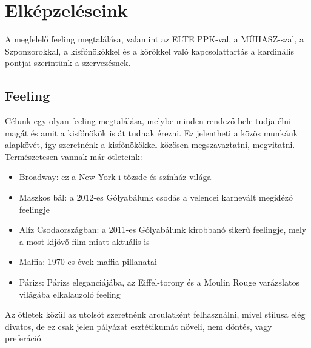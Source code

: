 \chapter{Elképzeléseink}\label{sect:Visions}
\hspace{2mm} A megfelelő feeling megtalálása, valamint az ELTE PPK-val, a MŰHASZ-szal, a Szponzorokkal, a kisfőnökökkel és a körökkel való kapcsolattartás a kardinális pontjai szerintünk a szervezésnek.

\section{Feeling}
\hspace{2mm} Célunk egy olyan feeling megtalálása, melybe minden rendező bele tudja élni magát és amit a kisfőnökök is át tudnak érezni. Ez jelentheti a közös munkánk alapkövét, így szeretnénk a kisfőnökökkel közösen megszavaztatni, megvitatni. Természetesen vannak már ötleteink:
\begin{itemize}
	\item Broadway: ez a New York-i tőzsde és színház világa
	\item Maszkos bál: a 2012-es Gólyabálunk csodás a velencei karnevált megidéző feelingje 
	\item Alíz Csodaországban: a 2011-es Gólyabálunk kirobbanó sikerű feelingje, mely a most kijövő film miatt aktuális is
	\item Maffia: 1970-es évek maffia pillanatai
	\item Párizs: Párizs eleganciájába, az Eiffel-torony és a Moulin Rouge varázslatos világába elkalauzoló feeling
\end{itemize}
\hspace{2mm} Az ötletek közül az utolsót szeretnénk arculatként felhasználni, mivel stílusa elég divatos, de ez csak jelen pályázat esztétikumát növeli, nem döntés, vagy preferáció.

